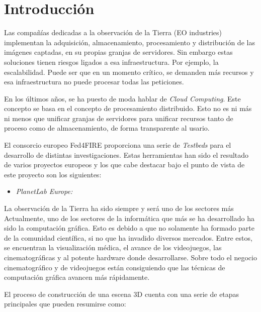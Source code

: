 \section{Introducción}
\label{sec:intro}

Las compañías dedicadas a la observación de la Tierra (EO industries) implementan la adquisición, almacenamiento, procesamiento y distribución de las imágenes captadas, en su propias granjas de servidores. Sin embargo estas soluciones tienen riesgos ligados a esa infraestructura. Por ejemplo, la escalabilidad. Puede ser que en un momento crítico, se demanden más recursos y esa infraestructura no puede procesar todas las peticiones.

En los últimos años, se ha puesto de moda hablar de \emph{Cloud Computing}. Este concepto se basa en el concepto de procesamiento distribuido. Esto no es ni más ni menos que unificar granjas de servidores para unificar recursos tanto de proceso como de almacenamiento, de forma transparente al usario.

El consorcio europeo Fed4FIRE \cite{F4F} proporciona una serie de \emph{Testbeds} para el desarrollo de distintas investigaciones. Estas herramientas han sido el resultado de varios proyectos europeos y los que cabe destacar bajo el punto de vista de este proyecto son los siguientes:
\begin{itemize}
\item \emph{PlanetLab Europe:}


\end{itemize}

La observación de la Tierra ha sido siempre y será uno de los sectores más
Actualmente, uno de los sectores de la informática que más se ha desarrollado ha sido
la computación gráfica. Esto es debido a que no solamente ha formado parte de la comunidad
científica, si no que ha invadido diversos mercados. Entre estos, se encuentran  la visualización médica, el avance de los videojuegos, las cinematográficas y al potente hardware donde desarrollarse.
Sobre todo el negocio cinematográfico y de videojuegos están consiguiendo que
las técnicas de computación gráfica avancen más rápidamente.

El proceso de construcción de una escena 3D cuenta con una
serie de etapas principales que pueden resumirse como:

